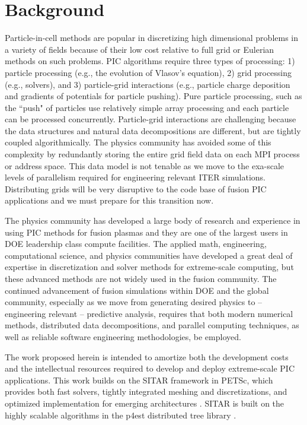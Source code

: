 \documentclass[review]{siamart}
\begin{document}
\section{Background}

Particle-in-cell methods are popular in discretizing high dimensional problems in a variety of fields because of their low cost relative to full grid or Eulerian methods on such problems.
PIC algorithms require three types of processing: 1) particle processing (e.g., the evolution of Vlasov's equation), 2) grid processing (e.g., solvers), and 3) particle-grid interactions (e.g., particle charge deposition and gradients of potentials for particle pushing).
Pure particle processing, such as the ``push" of particles use relatively simple array processing and each particle can be processed concurrently.
Particle-grid interactions are challenging because the data structures and natural data decompositions are different, but are tightly coupled algorithmically.
The physics community has avoided some of this complexity by redundantly storing the entire grid field data on each MPI process or address space.
This data model is not tenable as we move to the exa-scale levels of parallelism required for engineering relevant ITER simulations.
Distributing grids will be very disruptive to the code base of fusion PIC applications and we must prepare for this transition now.

The physics community has developed a large body of research and experience in using PIC methods for fusion plasmas and they are one of the largest users in DOE leadership class compute facilities.
The applied math, engineering, computational science, and physics communities have developed a great deal of expertise in discretization and solver methods for extreme-scale computing, but these advanced methods are not widely used in the fusion community.
The continued advancement of fusion simulations within DOE and the global community, especially as we move from generating desired physics to -- engineering relevant -- predictive analysis, requires that both modern numerical methods, distributed data decompositions, and parallel computing techniques, as well as reliable software engineering methodologies, be employed.

The work proposed herein is intended to amortize both the development costs and the intellectual resources required to develop and deploy extreme-scale PIC applications.
This work builds on the SITAR framework in PETSc, which provides both fast solvers, tightly integrated meshing and discretizations, and optimized implementation for emerging architectures \cite{KnepleyBrownMcInnesSmithRuppAdams2015}.
SITAR is built on the highly scalable algorithms in the p4est distributed tree library \cite{DBLP:journals/siamsc/IsaacBWG15,Rudi:2015:EIS:2807591.2807675,Stadler1033}.
\end{document}
